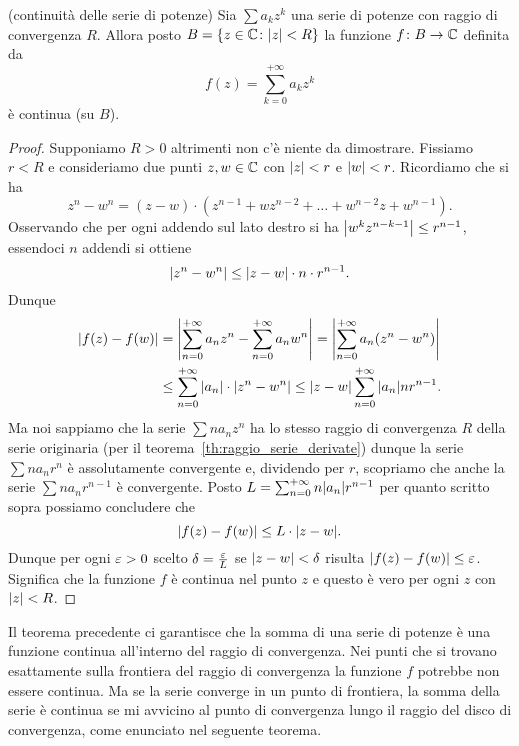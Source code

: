 \begin{theorem}(continuità delle serie di potenze)
\label{th:continuita_somma_serie}%
%
%
Sia $\sum a_k z^k$ una serie di potenze con raggio di convergenza $R$.
Allora posto $B={\left\{ z\in {\mathbb C}\colon {\left|z\right|}<R \right\}}$ la funzione $f\colon B \to {\mathbb C}$
definita da
\[
 f(z) = \sum_{k=0}^{+\infty} a_k z^k
\]
è continua (su $B$).
\end{theorem}
%
\begin{proof}
Supponiamo $R>0$ altrimenti non c'è niente da dimostrare.
Fissiamo $r<R$ e consideriamo due punti $z,w\in {\mathbb C}$ 
con ${\left|z\right|}<r$ e ${\left|w\right|}<r$.
Ricordiamo che si ha 
\[
  z^n - w^n = (z-w)\cdot(z^{n-1} + wz^{n-2} + \dots + w^{n-2}z + w^{n-1}).
\]
Osservando che per ogni addendo sul lato destro si ha 
${\left|w^k z^{n-k-1}\right|}\le r^{n-1}$, essendoci $n$ addendi si ottiene 
\[
  {\left|z^n - w^n\right|} \le {\left|z-w\right|}\cdot n\cdot  r^{n-1}.
\]
Dunque 
\begin{align*}
  {\left|f(z)-f(w)\right|} 
  &= {\left|\sum_{n=0}^{+\infty} a_n z^n - \sum_{n=0}^{+\infty} a_n w^n\right|}
   = {\left|\sum_{n=0}^{+\infty} a_n (z^n - w^n)\right|} \\
& \le \sum_{n=0}^{+\infty} {\left|a_n\right|} \cdot {\left|z^n - w^n\right|}
\le {\left|z-w\right|}\sum_{n=0}^{+\infty} {\left|a_n\right|} n r^{n-1}.
\end{align*}
Ma noi sappiamo che la serie $\sum n a_n z^n$ 
ha lo stesso raggio di convergenza $R$ della serie originaria 
(per il teorema~\ref{th:raggio_serie_derivate})
dunque la serie $\sum n a_n r^n$ è assolutamente convergente e, 
dividendo per $r$, 
scopriamo che anche la serie $\sum n a_n r^{n-1}$
è convergente. 
Posto $L = \sum_{n=0}^{+\infty} n {\left|a_n\right|} r^{n-1}$
per quanto scritto sopra possiamo concludere che 
\[
{\left|f(z)-f(w)\right|} \le L\cdot {\left|z-w\right|}.
\]
Dunque per ogni $\varepsilon>0$ scelto $\delta = \frac{\varepsilon}{L}$
se ${\left|z-w\right|}<\delta$ risulta ${\left|f(z)-f(w)\right|}\le \varepsilon$.
Significa che la funzione $f$ è continua nel punto $z$ e 
questo è vero per ogni $z$ con ${\left|z\right|}<R$.
\end{proof}

Il teorema precedente ci garantisce che la somma di una serie di potenze
è una funzione continua all'interno del raggio di convergenza.
Nei punti che si trovano esattamente sulla frontiera del raggio di convergenza
la funzione $f$ potrebbe non essere continua.
Ma se la serie converge in un
punto di frontiera, la somma della serie è continua se mi avvicino al punto di
convergenza lungo il raggio del disco di convergenza, come enunciato nel seguente teorema.

